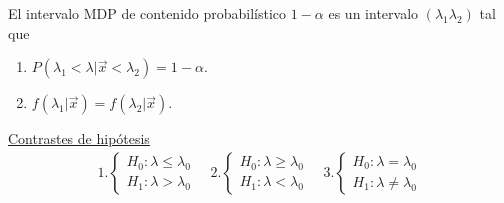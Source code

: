 \noindent El intervalo MDP de contenido probabilístico $1-\alpha$ es un intervalo $(\lambda_1\lambda_2)$ tal que
\begin{enumerate}
    \item $P(\lambda_1 < \lambda| \vec{x} < \lambda_2) = 1 - \alpha$.
    \item $f(\lambda_1 | \vec{x}) = f(\lambda_2 | \vec{x})$.
\end{enumerate}
\noindent \underline{Contrastes de hipótesis}
\begin{align*}
   1. \begin{cases}
        H_0 : \lambda \leq \lambda_0 \\
        H_1 : \lambda > \lambda_0
    \end{cases} \quad     2.\begin{cases}
        H_0 : \lambda \ge \lambda_0 \\
        H_1 : \lambda < \lambda_0
    \end{cases} \quad     3.\begin{cases}
        H_0 : \lambda = \lambda_0 \\
        H_1 : \lambda \not = \lambda_0
    \end{cases}
\end{align*}

